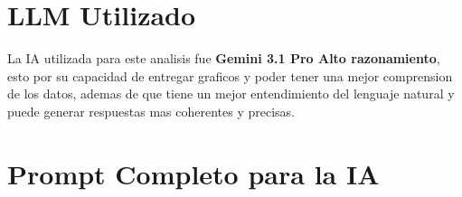 \documentclass[letterpaper,11pt]{article}
\begin{document}


\newpage
{\hypersetup{linkcolor=black}\tableofcontents}


\newpage

\setcounter{page}{1}
\singlespacing

\section{LLM Utilizado }

La IA utilizada para este analisis fue 
\textbf{Gemini 3.1 Pro Alto razonamiento}, esto por su capacidad de entregar
graficos y poder tener una mejor comprension de los datos, ademas de que tiene un mejor entendimiento del lenguaje natural y puede generar respuestas mas coherentes y precisas.

\section{Prompt Completo para la IA}
\end{document}

